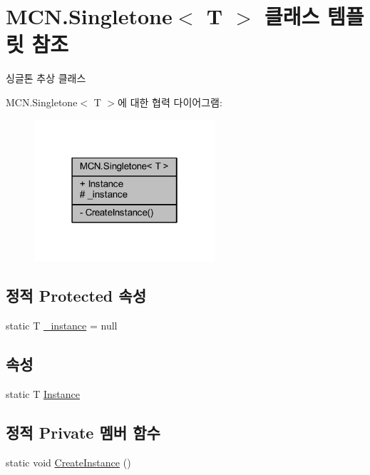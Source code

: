 \hypertarget{class_m_c_n_1_1_singletone}{}\section{M\+C\+N.\+Singletone$<$ T $>$ 클래스 템플릿 참조}
\label{class_m_c_n_1_1_singletone}


싱글톤 추상 클래스  




M\+C\+N.\+Singletone$<$ T $>$에 대한 협력 다이어그램\+:\nopagebreak
\begin{figure}[H]
\begin{center}
\leavevmode
\includegraphics[width=190pt]{class_m_c_n_1_1_singletone__coll__graph}
\end{center}
\end{figure}
\subsection*{정적 Protected 속성}
\begin{DoxyCompactItemize}
\item 
static T \hyperlink{class_m_c_n_1_1_singletone_a267e8a9e6e7c073b988cda4f95e26eb1}{\+\_\+instance} = null
\end{DoxyCompactItemize}
\subsection*{속성}
\begin{DoxyCompactItemize}
\item 
static T \hyperlink{class_m_c_n_1_1_singletone_a46dbbebd93e96a9592a9803c51f35602}{Instance}
\end{DoxyCompactItemize}
\subsection*{정적 Private 멤버 함수}
\begin{DoxyCompactItemize}
\item 
static void \hyperlink{class_m_c_n_1_1_singletone_a4f4f62d67cc4a98909639d3e09eaef07}{Create\+Instance} ()
\end{DoxyCompactItemize}


